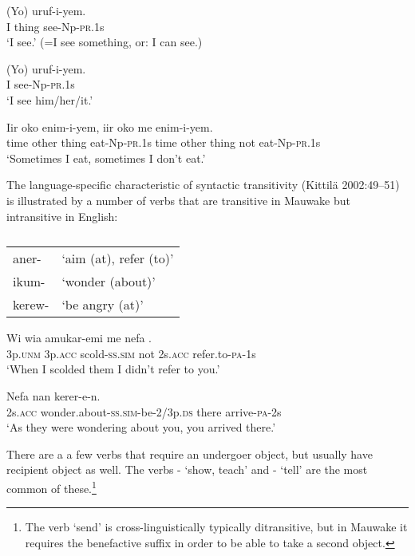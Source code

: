 \ea%
\label{ex:x300}
\gll (Yo)  uruf-i-yem. \\
I thing see-Np-\textsc{pr}.1s \\
\glt`I see.' (=I see something, or: I can see.) 
\z

\ea%
\label{ex:x301}
\gll (Yo) uruf-i-yem. \\
I see-Np-\textsc{pr}.1s \\
\glt`I see him/her/it.'
\z

\ea%
\label{ex:x1825}
\gll Iir oko  enim-i-yem, iir oko  me enim-i-yem. \\
time other thing eat-Np-\textsc{pr}.1s time other thing not eat-Np-\textsc{pr}.1s\\
\glt`Sometimes I eat, sometimes I don't eat.'
\z

The language-specific characteristic of syntactic transitivity (Kittil\"a 2002:49--51) is illustrated by a number of verbs that are transitive in Mauwake but intransitive in English:

\begin{table}
\caption{}
\label{} 
\begin{tabular}{ll}
aner- &`aim (at), refer (to)'\\
ikum- &`wonder (about)'\\
kerew- &`be angry (at)'\\
\end{tabular}

\end{table}

\ea%
\label{ex:x302}
\gll Wi wia amukar-emi me nefa . \\
3p.\textsc{unm} 3p.\textsc{acc} scold-\textsc{ss}.\textsc{sim} not 2s.\textsc{acc} refer.to-\textsc{pa}-1s \\
\glt`When I scolded them I didn't refer to you.'
\z

\ea%
\label{ex:x303}
\gll Nefa  nan kerer-e-n. \\
2s.\textsc{acc} wonder.about-\textsc{ss}.\textsc{sim}-be-2/3p.\textsc{ds} there arrive-\textsc{pa}-2s\\
\glt`As they were wondering about you, you arrived there.'
\z

There are a a few verbs that require an undergoer object, but usually have recipient object as well. The verbs - `show, teach' and - `tell' are the most common of these.\footnote{The verb `send' is cross-linguistically typically ditransitive, but in Mauwake it requires the benefactive suffix in order to be able to take a second object.} 

